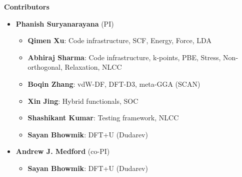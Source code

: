 \documentclass[xcolor=dvipsnames,t]{beamer}
\begin{document}
\begin{frame}[allowframebreaks]{\textbf{Contributors}} \label{Contributors}

  \begin{itemize}
  \item \textbf{Phanish Suryanarayana} (PI)
  \begin{itemize}
  \item \textbf{Qimen Xu}: Code infrastructure, SCF, Energy, Force, LDA \\  
  \item \textbf{Abhiraj Sharma}: Code infrastructure, k-points, PBE, Stress, Non-orthogonal, Relaxation, NLCC \\   
  \item \textbf{Boqin Zhang}: vdW-DF, DFT-D3, meta-GGA (SCAN) \\  
  \item \textbf{Xin Jing}: Hybrid functionals, SOC \\  
  \item \textbf{Shashikant Kumar}: Testing framework, NLCC \\ 
  \item \textbf{Sayan Bhowmik\footnotemark{}}: DFT+U (Dudarev)
  \end{itemize}
  \item \textbf{Andrew J. Medford} (co-PI)
  \begin{itemize}
      \item \textbf{Sayan Bhowmik\footnotemark[\value{footnote}]}: DFT+U (Dudarev)
  \end{itemize}
  \end{itemize}

  
\end{frame}
\end{document}
